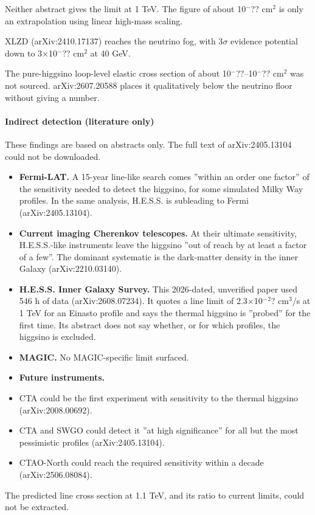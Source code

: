 \documentclass[11pt,a4paper]{article}
\begin{document}
Neither abstract gives the limit at 1 TeV. The figure of about 10$^-$?? cm$^2$ is only an extrapolation using linear high-mass scaling.

XLZD (arXiv:2410.17137) reaches the neutrino fog, with 3$\sigma$ evidence potential down to 3$\times$10$^-$?? cm$^2$ at 40 GeV.

The pure-higgsino loop-level elastic cross section of about 10$^-$??--10$^-$?? cm$^2$ was not sourced. arXiv:2607.20588 places it qualitatively below the neutrino floor without giving a number.

\paragraph{Indirect detection (literature only)}
These findings are based on abstracts only. The full text of arXiv:2405.13104 could not be downloaded.

\begin{itemize}
  \item \textbf{Fermi-LAT.} A 15-year line-like search comes ''within an order one factor'' of the sensitivity needed to detect the higgsino, for some simulated Milky Way profiles. In the same analysis, H.E.S.S. is subleading to Fermi (arXiv:2405.13104).
  \item \textbf{Current imaging Cherenkov telescopes.} At their ultimate sensitivity, H.E.S.S.-like instruments leave the higgsino ''out of reach by at least a factor of a few''. The dominant systematic is the dark-matter density in the inner Galaxy (arXiv:2210.03140).
  \item \textbf{H.E.S.S. Inner Galaxy Survey.} This 2026-dated, unverified paper used 546 h of data (arXiv:2608.07234). It quotes a line limit of 2.3$\times$10$^-$$^2$? cm$^3$/s at 1 TeV for an Einasto profile and says the thermal higgsino is ''probed'' for the first time. Its abstract does not say whether, or for which profiles, the higgsino is excluded.
  \item \textbf{MAGIC.} No MAGIC-specific limit surfaced.
  \item \textbf{Future instruments.}
  \item CTA could be the first experiment with sensitivity to the thermal higgsino (arXiv:2008.00692).
  \item CTA and SWGO could detect it ''at high significance'' for all but the most pessimistic profiles (arXiv:2405.13104).
  \item CTAO-North could reach the required sensitivity within a decade (arXiv:2506.08084).
\end{itemize}
The predicted line cross section at 1.1 TeV, and its ratio to current limits, could not be extracted.
\end{document}
